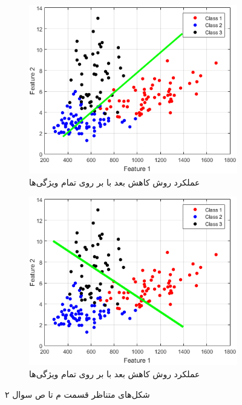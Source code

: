 \documentclass{article}
\begin{document}
\begin{figure}[h]
\begin{subfigure}{0.3\linewidth}
        \centering
        \includegraphics[scale=0.15]{images/q2/pca_all.png}
        \caption{عملکرد روش کاهش بعد  با بر روی تمام ویژگی‌ها}
    \end{subfigure}
    \hfill
    \begin{subfigure}{0.3\linewidth}
        \centering
        \includegraphics[scale=0.15]{images/q2/fisher_all.png}
        \caption{عملکرد روش کاهش بعد  با بر روی تمام ویژگی‌ها}
    \end{subfigure}
    \caption{شکل‌های متناظر قسمت م تا ص سوال ۲}
    \label{q2_m_to_r_figures}
\end{figure}
\end{document}
